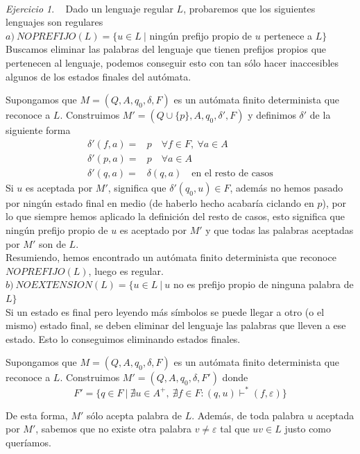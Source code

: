 \documentclass[12pt,spanish]{article}
\theoremstyle{definition}
\theoremstyle{remark}
\newtheorem{exercise}{Ejercicio}%
\begin{document}
~

\begin{exercise}~ Dado un lenguaje regular $L$, probaremos que los
  siguientes lenguajes son regulares \\
  
  $a) \ NOPREFIJO(L)=\{u\in L \ |$ ningún prefijo propio de $u$ pertenece a $L\}$ \\

  Buscamos eliminar las palabras del lenguaje que tienen prefijos
  propios que pertenecen al lenguaje, podemos conseguir esto con tan
  sólo hacer inaccesibles algunos de los estados finales del autómata.

  Supongamos que $M=(Q,A,q_0,\delta,F)$ es un autómata finito
  determinista que reconoce a $L$. Construimos
  $M'=(Q\cup\{p\},A,q_0,\delta',F)$ y definimos $\delta'$ de la
  siguiente forma
  \begin{align*}
    \delta'(f,a)=&p \quad \forall f \in F, \ \forall a \in A \\
    \delta'(p,a)=&p \quad \forall a \in A \\
    \delta'(q,a)=&\delta(q,a) \quad \text{en el resto de casos}
  \end{align*}
  Si $u$ es aceptada por $M'$, significa que $\delta'(q_0,u) \in F$,
  además no hemos pasado por ningún estado final en medio (de haberlo
  hecho acabaría ciclando en $p$), por lo que siempre hemos aplicado
  la definición del resto de casos, esto significa que ningún prefijo
  propio de $u$ es aceptado por $M'$ y que todas las palabras
aceptadas por $M'$ son de $L$. \\

  Resumiendo, hemos encontrado un autómata finito determinista que
reconoce $NOPREFIJO(L)$, luego es regular. \\

$b) \ NOEXTENSION(L)=\{u\in L \ | \ u$ no es prefijo propio de ninguna
palabra de $L\}$ \\

  Si un estado es final pero leyendo más símbolos se puede llegar a
otro (o el mismo) estado final, se deben eliminar del lenguaje las
palabras que lleven a ese estado. Esto lo conseguimos eliminando
estados finales.

  Supongamos que $M=(Q,A,q_0,\delta,F)$ es un autómata finito
determinista que reconoce a $L$. Construimos $M'=(Q,A,q_0,\delta,F')$
donde
  \[F'=\{q\in F \ | \ \nexists u \in A^+, \ \nexists f \in F :
(q,u)\vdash^* (f,\varepsilon)\}\]

De esta forma, $M'$ sólo acepta palabra de $L$. Además, de toda
palabra $u$ aceptada por $M'$, sabemos que no existe otra palabra $v
\neq \varepsilon$ tal que $uv \in L$ justo como queríamos. \\


\end{exercise}
\end{document}
